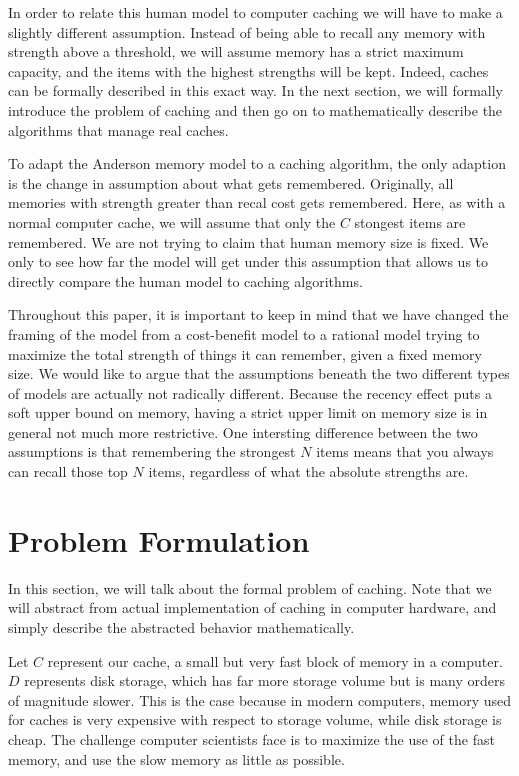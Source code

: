 \documentclass[10pt,letterpaper]{article}
\begin{document}
In order to relate this human model to computer caching we will have to make a slightly different assumption. Instead of being able to recall any
memory with strength above a threshold, we will assume memory has a strict maximum
capacity, and the items with the highest strengths will be kept. Indeed, caches
can be formally described in this exact way. In the next section, we will
formally introduce the problem of caching and then go on to mathematically describe the algorithms that manage real caches. 

To adapt the Anderson memory model to a caching algorithm, the only adaption is the change in assumption
about what gets remembered. Originally, all memories with strength greater
than recal cost gets remembered. Here, as with a normal computer cache,
we will assume that only the $C$ stongest items are remembered. We are not
trying to claim that human memory size is fixed. We only to see how far the
model will get under this assumption that allows us to directly compare the human model to caching algorithms.

Throughout this paper, it is important to keep in mind that we have changed the framing of the model from a cost-benefit model to a rational
model trying to maximize the total strength of things it can remember, given a fixed memory size. We would like
to argue that the assumptions beneath the two different types of models are actually not radically different. Because the recency
effect puts a soft upper bound on memory, having a strict upper limit on memory size is in general not much more restrictive. One intersting
difference between the two assumptions is that remembering the strongest $N$ items means that you always can recall those top $N$ items, regardless
of what the absolute strengths are. 


\section{Problem Formulation}

In this section, we will talk about the formal problem of caching. Note that we will abstract from actual implementation
of caching in computer hardware, and simply describe the abstracted behavior mathematically.

Let $C$ represent our cache, a small but very fast block of
memory in a computer. $D$ represents disk storage, which has far more storage volume but is many orders of magnitude slower. This is the case because 
in modern computers, memory used for caches is very expensive with respect
to storage volume, while disk storage is cheap.
The challenge computer scientists face is to maximize the use of the fast
memory, and use the slow memory as little as possible. 
\end{document}
